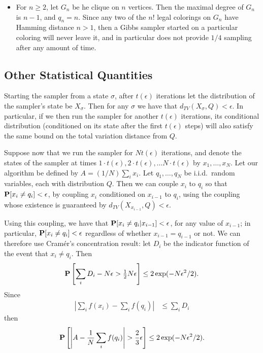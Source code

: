 \documentclass[11pt]{article} \usepackage{amssymb}
\newcommand{\half}{{\textstyle \frac12}}
\begin{document}
\begin{itemize}
\item
For $n \geq 2$, let $G_n$ be he clique on $n$ vertices. Then the maximal degree
of $G_n$ is $n-1$, and $q_n=n$. Since any two of the $n!$ legal colorings on 
$G_n$ have
Hamming distance $n>1$, then a Gibbs sampler started on a particular coloring
will never leave it, and in particular does not provide $1/4$ sampling after
any amount of time.


\end{itemize}
\subsection{Other Statistical Quantities}
Starting the sampler from a state $\sigma$, after $t(\epsilon)$ iterations
let the distribution of the sampler's state be $X_\sigma$. Then for any 
$\sigma$ we have that $d_{TV}(X_\sigma,Q)<\epsilon$. In particular, if we
then run the sampler for another $t(\epsilon)$ iterations, its conditional
distribution (conditioned on its state after the first $t(\epsilon)$ steps)
will also satisfy the same bound on the total variation distance from $Q$. 

Suppose now that we run the sampler for $Nt(\epsilon)$ iterations, and
denote the states of the sampler at times 
$1\cdot t(\epsilon),2\cdot t(\epsilon),\ldots N\cdot t(\epsilon)$ by
$x_1,\ldots,x_N$. Let our algorithm be defined by $A=(1/N)\sum_ix_i$. 
Let $q_1,\ldots,q_N$ be i.i.d.\ random variables, each with
distribution $Q$. Then we can couple $x_i$ to $q_i$ so that 
$\P[x_i\neq q_i]<\epsilon$, by coupling  $x_i$ conditioned on $x_{i-1}$ 
 to $q_i$, using the coupling whose existence is guaranteed by $d_{TV}(X_{x_{i-1}},Q)<\epsilon$. 

Using this coupling, we have that $\P[x_i\neq q_i|x_{i-1}]<\epsilon$, for any
value of $x_{i-1}$; in particular, $\P[x_i\neq q_i]<\epsilon$ regardless of
whether $x_{i-1}=q_{i-1}$ or not. We can therefore use Cram\'er's concentration result:
let $D_i$ be the indicator function of the event that $x_i\neq q_i$. Then
\begin{align*}
  \P\left[\sum_i D_i-N\epsilon>\half N\epsilon\right] \leq 2\exp(-N\epsilon^2/2).
\end{align*}
Since
\begin{align*}
  \left|\sum_if(x_i)-\sum_if(q_i)\right| & \leq \sum_i D_i
\end{align*}
then
\begin{align*}
  \P\left[\left|A-{1\over N}\sum_if(q_i)\right|>{2\over 3}\epsilon\right] \leq 2\exp(-N\epsilon^2/2).
\end{align*}
\end{document}
